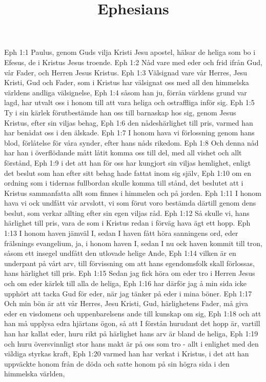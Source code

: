 

\title{Ephesians}

Eph 1:1  Paulus, genom Guds vilja Kristi Jesu apostel, hälsar de heliga som bo i Efesus, de i Kristus Jesus troende.
Eph 1:2  Nåd vare med eder och frid ifrån Gud, vår Fader, och Herren Jesus Kristus.
Eph 1:3  Välsignad vare vår Herres, Jesu Kristi, Gud och Fader, som i Kristus har välsignat oss med all den himmelska världens andliga välsignelse,
Eph 1:4  såsom han ju, förrän världens grund var lagd, har utvalt oss i honom till att vara heliga och ostraffliga inför sig.
Eph 1:5  Ty i sin kärlek förutbestämde han oss till barnaskap hos sig, genom Jesus Kristus, efter sin viljas behag,
Eph 1:6  den nådeshärlighet till pris, varmed han har benådat oss i den älskade.
Eph 1:7  I honom hava vi förlossning genom hans blod, förlåtelse för våra synder, efter hans nåds rikedom.
Eph 1:8  Och denna nåd har han i överflödande mått låtit komma oss till del, med all vishet och allt förstånd,
Eph 1:9  i det att han för oss har kungjort sin viljas hemlighet, enligt det beslut som han efter sitt behag hade fattat inom sig själv,
Eph 1:10  om en ordning som i tidernas fullbordan skulle komma till stånd, det beslutet att i Kristus sammanfatta allt som finnes i himmelen och på jorden.
Eph 1:11  I honom hava vi ock undfått vår arvslott, vi som förut voro bestämda därtill genom dens beslut, som verkar allting efter sin egen viljas råd.
Eph 1:12  Så skulle vi, hans härlighet till pris, vara de som i Kristus redan i förväg hava ägt ett hopp.
Eph 1:13  I honom haven jämväl I, sedan I haven fått höra sanningens ord, eder frälsnings evangelium, ja, i honom haven I, sedan I nu ock haven kommit till tron, såsom ett insegel undfått den utlovade helige Ande,
Eph 1:14  vilken är en underpant på vårt arv, till förvissning om att hans egendomsfolk skall förlossas, hans härlighet till pris.
Eph 1:15  Sedan jag fick höra om eder tro i Herren Jesus och om eder kärlek till alla de heliga,
Eph 1:16  har därför jag å min sida icke upphört att tacka Gud för eder, när jag tänker på eder i mina böner.
Eph 1:17  Och min bön är att vår Herres, Jesu Kristi, Gud, härlighetens Fader, må giva eder en visdomens och uppenbarelsens ande till kunskap om sig,
Eph 1:18  och att han må upplysa edra hjärtans ögon, så att I förstån hurudant det hopp är, vartill han har kallat eder, huru rikt på härlighet hans arv är bland de heliga,
Eph 1:19  och huru översvinnligt stor hans makt är på oss som tro - allt i enlighet med den väldiga styrkas kraft,
Eph 1:20  varmed han har verkat i Kristus, i det att han uppväckte honom från de döda och satte honom på sin högra sida i den himmelska världen,
